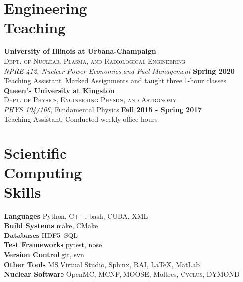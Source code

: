 \documentclass[margin,line]{resume}
\begin{document}
\begin{resume}
    \section{\mysidestyle Engineering\\Teaching}
    \textbf{University of Illinois at Urbana-Champaign}\\
    \textsc{Dept. of Nuclear, Plasma, and Radiological Engineering}\\ 
               \textsl{NPRE 412, Nuclear Power Economics and Fuel Management} \hfill \textbf{Spring 2020}\\
               Teaching Assistant, Marked Assignments and taught three 1-hour classes
               \vspace{2mm}\\
        \textbf{Queen's University at Kingston}\\
        \textsc{Dept. of Physics, Engineering Physics, and Astronomy}\\ 
                        \textsl{PHYS 104/106}, Fundamental Physics \hfill \textbf{Fall 2015 - Spring 2017}\\
                        Teaching Assistant, Conducted weekly office hours

    \section{\mysidestyle Scientific\\Computing\\Skills}
                \textbf{Languages} \hfill Python, C++, bash, CUDA, XML\vspace{.5mm}\\%
                \textbf{Build Systems} \hfill make, CMake\vspace{.5mm}\\%
                \textbf{Databases} \hfill HDF5, SQL\vspace{.5mm}\\%
                \textbf{Test Frameworks} \hfill pytest, nose\vspace{.5mm}\\%
                \textbf{Version Control} \hfill git, svn\vspace{.5mm}\\%
                \textbf{Other Tools} \hfill MS Virtual Studio, Sphinx, RAI, \LaTeX, MatLab\vspace{.5mm}\\%
                \textbf{Nuclear Software} \hfill OpenMC, MCNP, MOOSE, Moltres, \textsc{Cyclus}, DYMOND
                \vspace{-0.3cm}



\end{resume}
\end{document}
